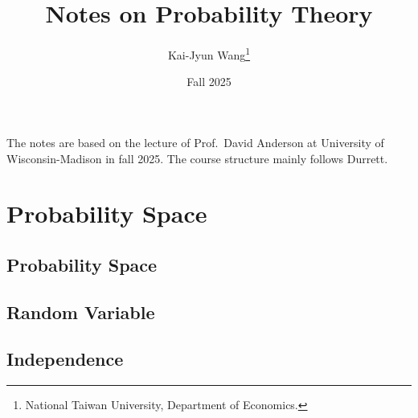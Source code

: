 \documentclass[a4paper, 12pt]{article}
\title{Notes on Probability Theory}
\author{Kai-Jyun Wang\thanks{National Taiwan University, Department of Economics.}}
\date{Fall 2025}
\begin{document}
 
\maketitle

The notes are based on the lecture of Prof.\ David Anderson at University of Wisconsin-Madison 
in fall 2025. The course structure mainly follows Durrett. 

\newpage 
\tableofcontents
\newpage

\section{Probability Space}
\subsection{Probability Space}

\newpage

\subsection{Random Variable}

\newpage

\subsection{Independence}

\newpage
\end{document}
